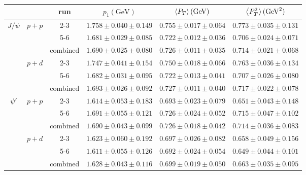 \begin{tabular}{ccc|c|c|c}
\hline
                      &                                             & run      & $p_1(\unit{\GeV})$        & $\expval{P_T}(\unit{\GeV})$& $\expval{P^2_T}(\unit{\GeV\squared})$        \\ \hline
\multicolumn{1}{c|}{\multirow{6}{*}{$J/\psi$}} &
  \multicolumn{1}{c|}{\multirow{3}{*}{$p+p$}} &
  2-3 &
  $1.758\pm0.040\pm0.149$ &
  $0.755\pm0.017\pm0.064$ &
  $0.773\pm0.035\pm0.131$ \\ \cline{3-6} 
\multicolumn{1}{c|}{} & \multicolumn{1}{c|}{}                       & 5-6      & $1.681\pm0.029\pm0.085$ & $0.722\pm0.012\pm0.036$ & $0.706\pm0.024\pm0.071$ \\ \cline{3-6} 
\multicolumn{1}{c|}{} & \multicolumn{1}{c|}{}                       & combined & $1.690\pm0.025\pm0.080$ & $0.726\pm0.011\pm0.035$ & $0.714\pm0.021\pm0.068$ \\ \cline{2-6} 
\multicolumn{1}{c|}{} & \multicolumn{1}{c|}{\multirow{3}{*}{$p+d$}} & 2-3      & $1.747\pm0.041\pm0.154$ & $0.750\pm0.018\pm0.066$ & $0.763\pm0.036\pm0.134$ \\ \cline{3-6} 
\multicolumn{1}{c|}{} & \multicolumn{1}{c|}{}                       & 5-6      & $1.682\pm0.031\pm0.095$ & $0.722\pm0.013\pm0.041$ & $0.707\pm0.026\pm0.080$ \\ \cline{3-6} 
\multicolumn{1}{c|}{} & \multicolumn{1}{c|}{}                       & combined & $1.693\pm0.026\pm0.092$ & $0.727\pm0.011\pm0.040$ & $0.717\pm0.022\pm0.078$ \\ \hline
\multicolumn{1}{c|}{\multirow{6}{*}{$\psi'$}} &
  \multicolumn{1}{c|}{\multirow{3}{*}{$p+p$}} &
  2-3 &
  $1.614\pm0.053\pm0.183$ &
  $0.693\pm0.023\pm0.079$ &
  $0.651\pm0.043\pm0.148$ \\ \cline{3-6} 
\multicolumn{1}{c|}{} & \multicolumn{1}{c|}{}                       & 5-6      & $1.691\pm0.055\pm0.121$ & $0.726\pm0.024\pm0.052$ & $0.715\pm0.047\pm0.102$ \\ \cline{3-6} 
\multicolumn{1}{c|}{} & \multicolumn{1}{c|}{}                       & combined & $1.690\pm0.043\pm0.099$ & $0.726\pm0.018\pm0.042$ & $0.714\pm0.036\pm0.083$ \\ \cline{2-6} 
\multicolumn{1}{c|}{} & \multicolumn{1}{c|}{\multirow{3}{*}{$p+d$}} & 2-3      & $1.623\pm0.060\pm0.192$ & $0.697\pm0.026\pm0.082$ & $0.658\pm0.049\pm0.156$ \\ \cline{3-6} 
\multicolumn{1}{c|}{} & \multicolumn{1}{c|}{}                       & 5-6      & $1.611\pm0.055\pm0.126$ & $0.692\pm0.024\pm0.054$ & $0.649\pm0.044\pm0.101$ \\ \cline{3-6} 
\multicolumn{1}{c|}{} & \multicolumn{1}{c|}{}                       & combined & $1.628\pm0.043\pm0.116$ & $0.699\pm0.019\pm0.050$ & $0.663\pm0.035\pm0.095$ \\ \hline
\end{tabular}